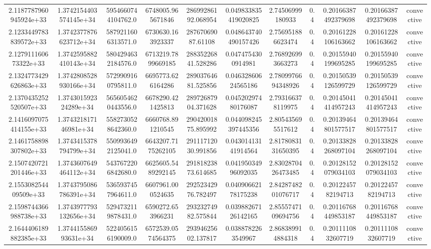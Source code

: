\begin{table}
\begin{tabular}{ccccccccccc}
2.1187787960945924e+33 & 1.3742154403574145e+34 & 5954660744104762.0 & 6748005.965671846 & 28699286192.068954 & 0.049833835419020825 & 2.74506999180933 & 0.4 & 0.20166387492379698 & 0.20166387492379698 & convective \\
2.1233449783839572e+33 & 1.3742377876623712e+34 & 5879211606313571.0 & 6730630.163923337 & 28767069087.61108 & 0.048643740490157426 & 2.756951886623474 & 0.4 & 0.20161228106163662 & 0.20161228106163662 & convective \\
2.127911160673322e+33 & 1.3742595882410143e+34 & 5804294632184576.0 & 6713219.7899669185 & 28835226841.528286 & 0.0474754300914981 & 2.768926993663273 & 0.4 & 0.20155940199695285 & 0.20155940199695285 & convective \\
2.1324773429626863e+33 & 1.3742808528930166e+34 & 5729909160795811.0 & 6695773.626164286 & 28903764681.525856 & 0.04632860624565186 & 2.7809976694348926 & 0.4 & 0.20150539126599729 & 0.20150539126599729 & convective \\
2.1370435252520507e+33 & 1.374301592324289e+34 & 5656054620443556.0 & 6678290.421425813 & 28972687904.371628 & 0.04520297480176087 & 2.793166378119975 & 0.4 & 0.20145041414957243 & 0.20145041414957243 & convective \\
2.1416097075414155e+33 & 1.374321817146981e+34 & 5582730528642360.0 & 6660768.891210545 & 29042001875.895992 & 0.044098245397445356 & 2.805435695517612 & 0.4 & 0.20139464801577517 & 0.20139464801577517 & convective \\
2.1461758898307802e+33 & 1.3743415378794799e+34 & 5509936492125041.0 & 6643207.7175262105 & 29111712030.991856 & 0.04301413141914564 & 2.8178083131650395 & 0.4 & 0.20133828268097104 & 0.20133828268097104 & convective \\
2.1507420721201446e+33 & 1.3743607649464112e+34 & 5437672206842680.0 & 6625605.5489292145 & 29181823873.614685 & 0.04195034996092035 & 2.8302870426473485 & 0.4 & 0.20128152079034103 & 0.20128152079034103 & convective \\
2.155308254409509e+33 & 1.3743795086786391e+34 & 5365937457964611.0 & 6607961.000524635 & 29252342976.782497 & 0.04090662178175238 & 2.8428748201076717 & 0.4 & 0.2012245782194713 & 0.2012245782194713 & convective \\
2.1598744366988738e+33 & 1.3743977793132656e+34 & 5294732119878431.0 & 6590272.653966231 & 29323274982.575844 & 0.03988267126142165 & 2.8555747109694756 & 0.4 & 0.20116768449853187 & 0.20116768449853187 & convective \\
2.1644406189882385e+33 & 1.374415586993631e+34 & 5224056156190009.0 & 6572539.0574564375 & 29394625602.137817 & 0.0388782263549967 & 2.868389914884318 & 0.4 & 0.2011110832607719 & 0.2011110832607719 & convective \\

\end{tabular}
\end{table}
